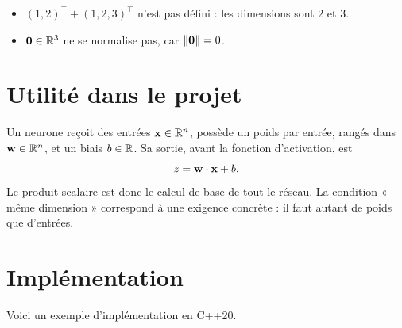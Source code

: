 \begin{example}
\begin{itemize}
    \item $(1, 2)^\top + (1, 2, 3)^\top$ n'est pas défini :
          les dimensions sont $2$ et $3$.
    \item $\mathbf{0} \in \mathbb{R}^3$ ne se normalise pas,
          car $\left\|\mathbf{0}\right\| = 0$.
\end{itemize}
\end{example}

\section{Utilité dans le projet}
\label{sec-vecteurs-utilite}

Un neurone reçoit des entrées $\mathbf{x} \in \mathbb{R}^n$,
possède un poids par entrée, rangés dans
$\mathbf{w} \in \mathbb{R}^n$, et un biais $b \in \mathbb{R}$. Sa sortie,
avant la fonction d'activation, est
\[
    z = \mathbf{w} \cdot \mathbf{x} + b.
\]
Le produit scalaire est donc le calcul de base de
tout le réseau. La condition « même dimension »
correspond à une exigence concrète : il faut autant de
poids que d'entrées.


\section{Implémentation}

\begin{codebox}
Voici un exemple d'implémentation en C++20.
\end{codebox}



\newpage
